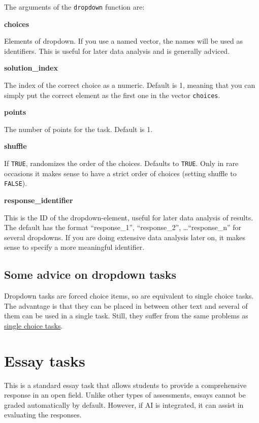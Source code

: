 \documentclass[twoside]{tufte-book}
\begin{document}
The arguments of the \texttt{dropdown} function are:

\noindent\textbf{choices}\label{choices}

Elements of dropdown. If you use a named vector, the names will be used as identifiers. This is useful for later data analysis and is generally adviced.

\noindent\textbf{solution\_index}\label{solution_index}

The index of the correct choice as a numeric. Default is 1, meaning that you can simply put the correct element as the first one in the vector \texttt{choices}.

\noindent\textbf{points}\label{points-4}

The number of points for the task. Default is 1.

\noindent\textbf{shuffle}\label{shuffle-2}

If \texttt{TRUE}, randomizes the order of the choices. Defaults to \texttt{TRUE}. Only in rare occasions it makes sense to have a strict order of choices (setting shuffle to \texttt{FALSE}).

\noindent\textbf{response\_identifier}\label{response_identifier-2}

This is the ID of the dropdown-element, useful for later data analysis of results. The default has the format ``response\_1'', ``response\_2'', \ldots{}``response\_n'' for several dropdowns. If you are doing extensive data analysis later on, it makes sense to specify a more meaningful identifier.

\section{Some advice on dropdown tasks}\label{some-advice-on-dropdown-tasks}

Dropdown tasks are forced choice items, so are equivalent to single choice tasks. The advantage is that they can be placed in between other text and several of them can be used in a single task. Still, they suffer from the same problems as \href{singlechoice.html}{single choice tasks}.

\chapter{Essay tasks}\label{essay-tasks}

This is a standard essay task that allows students to provide a comprehensive response in an open field. Unlike other types of assessments, essays cannot be graded automatically by default. However, if AI is integrated, it can assist in evaluating the responses.
\end{document}
